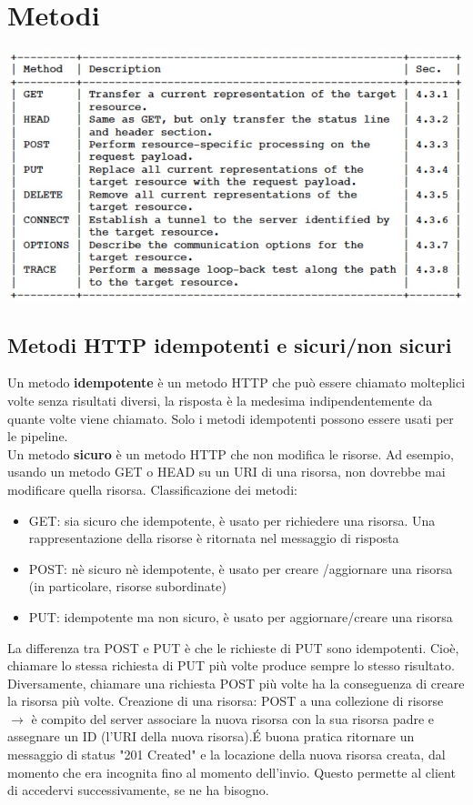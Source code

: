 \section{Metodi}
\begin{center}
\includegraphics[scale=0.4]{Images/TecnologieWeb/1/MethodsHTTP.jpg}    
\end{center}

\subsection{Metodi HTTP idempotenti e sicuri/non sicuri}
Un metodo \textbf{idempotente} è un metodo HTTP che può essere chiamato molteplici volte senza risultati diversi, la risposta è la medesima indipendentemente da quante volte viene chiamato. Solo i metodi idempotenti possono essere usati per le pipeline.\\
Un metodo \textbf{sicuro} è un metodo HTTP che non modifica le risorse. Ad esempio, usando un metodo GET o HEAD su un URI di una risorsa, non dovrebbe mai modificare quella risorsa.
\hfill \break
Classificazione dei metodi:
\begin{itemize}
    \item GET: sia sicuro che idempotente, è usato per richiedere una risorsa. Una rappresentazione della risorse è ritornata nel messaggio di risposta
    \item POST: nè sicuro nè idempotente, è usato per creare /aggiornare una risorsa (in particolare, risorse subordinate)
    \item PUT: idempotente ma non sicuro, è usato per aggiornare/creare una risorsa
\end{itemize}
La differenza tra POST e PUT è che le richieste di PUT sono idempotenti. Cioè, chiamare lo stessa richiesta di PUT più volte produce sempre lo stesso risultato. Diversamente, chiamare una richiesta POST più volte ha la conseguenza di creare la risorsa più volte.  
\hfill \break
Creazione di una risorsa: POST a una collezione di risorse $\rightarrow$ è compito del server associare la nuova risorsa con la sua risorsa padre e assegnare un ID (l'URI della nuova risorsa).\'E buona pratica ritornare un messaggio di status "201 Created" e la locazione della nuova risorsa creata, dal momento che era incognita fino al momento dell'invio. Questo permette al client di accedervi successivamente, se ne ha bisogno.

